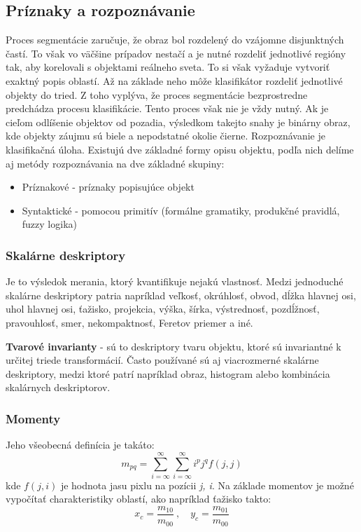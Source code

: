 \subsection{Príznaky a rozpoznávanie}
Proces segmentácie zaručuje, že obraz bol rozdelený do vzájomne disjunktných častí. To však vo väčšine prípadov nestačí a je nutné rozdeliť jednotlivé regióny tak, aby korelovali s objektami reálneho sveta. To si však vyžaduje vytvoriť exaktný popis oblastí. Až na základe neho môže klasifikátor rozdeliť jednotlivé objekty do tried. Z toho vyplýva, že proces segmentácie bezprostredne predchádza procesu klasifikácie. Tento proces však nie je vždy nutný. Ak je cieľom odlíšenie objektov od pozadia, výsledkom takejto snahy je binárny obraz, kde objekty záujmu sú biele a nepodstatné okolie čierne.
Rozpoznávanie je klasifikačná úloha. Existujú dve základné formy opisu objektu, podľa nich delíme aj metódy rozpoznávania na dve základné skupiny: \cite{Analysis_and_Machine_Vision}

\begin{itemize}
    \item Príznakové - príznaky popisujúce objekt 
    \item Syntaktické - pomocou primitív (formálne gramatiky, produkčné pravidlá, fuzzy logika)
\end{itemize}

\subsubsection{Skalárne deskriptory}
Je to výsledok merania, ktorý kvantifikuje nejakú vlastnosť. Medzi jednoduché skalárne deskriptory patria napríklad veľkosť, okrúhlosť, obvod, dĺžka hlavnej osi, uhol hlavnej osi, ťažisko, projekcia, výška, šírka, výstrednosť, pozdĺžnosť, pravouhlosť, smer, nekompaktnosť, Feretov priemer a iné. \cite{Analysis_and_Machine_Vision} 

\textbf{Tvarové invarianty} - sú to deskriptory tvaru objektu, ktoré sú invariantné k určitej triede transformácií.
Často používané sú aj viacrozmerné skalárne deskriptory, medzi ktoré patrí napríklad obraz, histogram alebo kombinácia skalárnych deskriptorov. \cite{Analysis_and_Machine_Vision} 

\subsubsection{Momenty}

Jeho všeobecná definícia je takáto: \cite{pocitacove_videnie_v_praxi}
\begin{equation}
    m_{pq}=\sum_{i=\infty}^\infty \sum_{i=\infty}^\infty i^p j^q f(j,j)
\end{equation}
kde $f(j,i)$ je hodnota jasu pixlu na pozícii \textit{j, i}.
Na základe momentov je možné vypočítať charakteristiky oblastí, ako napríklad ťažisko takto: 
\begin{equation}
    x_c=\frac{m_{10}}{m_{00}}\ {,}\quad y_c=\frac{m_{01}}{m_{00}}
\end{equation}

